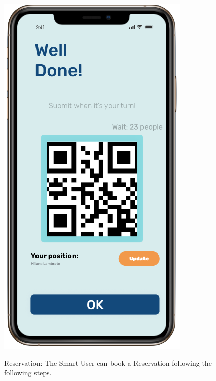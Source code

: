 \begin{figure}[H]
\begin{center}
{            \includegraphics[scale=0.35]{images/mockup/qrcode_reservation_done.png}
        }%
%
    \end{center}
    \caption{%
       Reservation: The Smart User can book a Reservation following the following steps.
     }%
   \label{fig:subfigures}
\end{figure}

